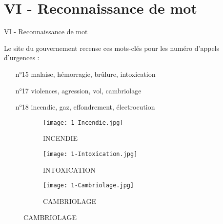 
\section{VI - Reconnaissance de mot}
\begin{frame}{VI - Reconnaissance de mot}
	\begin{block}{}
		Le site du gouvernement recense ces mots-clés pour les numéro d'appels d'urgences : \\
		\begin{enumerate}
		  \item[n°15] malaise, hémorragie, brûlure, intoxication
		  \item[n°17] violences, agression, vol, cambriolage
		  \item[n°18] incendie, gaz, effondrement, électrocution
		\end{enumerate}
	\end{block}
\begin{figure}
	\begin{subfigure}[]{0.3\textwidth}
		\texttt{[image: 1-Incendie.jpg]}
  		\caption{INCENDIE}
	\end{subfigure}
	\begin{subfigure}[]{0.3\textwidth}
		\texttt{[image: 1-Intoxication.jpg]}
  		\caption{INTOXICATION}
	\end{subfigure}
	\begin{subfigure}[]{0.3\textwidth}
		\texttt{[image: 1-Cambriolage.jpg]}
		\caption{CAMBRIOLAGE}
	\end{subfigure}
\end{figure}
\end{frame}

